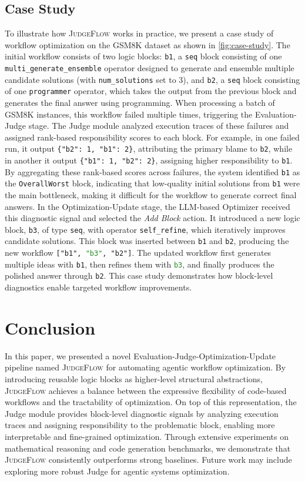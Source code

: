 \documentclass{article}
\theoremstyle{plain}
\theoremstyle{definition}
\theoremstyle{remark}
\def \our{\textsc{JudgeFlow}}
\begin{document}
\subsection{Case Study}
To illustrate how \our{} works in practice, we present a case study of workflow optimization on the GSM8K dataset as shown in \cref{fig:case-study}. The initial workflow consists of two logic blocks: \texttt{b1}, a \texttt{seq} block consisting of one \texttt{multi\_generate\_ensemble} operator designed to generate and ensemble multiple candidate solutions (with \texttt{num\_solutions} set to 3), and \texttt{b2}, a \texttt{seq} block consisting of one \texttt{programmer} operator, which takes the output from the previous block and generates the final answer using programming. When processing a batch of GSM8K instances, this workflow failed multiple times, triggering the Evaluation-Judge stage. The Judge module analyzed execution traces of these failures and assigned rank-based responsibility scores to each block. For example, in one failed run, it output \texttt{\{"b2": 1, "b1": 2\}}, attributing the primary blame to \texttt{b2}, while in another it output \texttt{\{"b1": 1, "b2": 2\}}, assigning higher responsibility to \texttt{b1}. By aggregating these rank-based scores across failures, the system identified \texttt{b1} as the \texttt{OverallWorst} block, indicating that low-quality initial solutions from \texttt{b1} were the main bottleneck, making it difficult for the workflow to generate correct final answers. In the Optimization-Update stage, the LLM-based Optimizer received this diagnostic signal and selected the \textit{Add Block} action. It introduced a new logic block, \texttt{b3}, of type \texttt{seq}, with operator \texttt{self\_refine}, which iteratively improves candidate solutions. This block was inserted between \texttt{b1} and \texttt{b2}, producing the new workflow \texttt{["b1", \textcolor{ForestGreen}{"b3"}, "b2"]}. The updated workflow first generates multiple ideas with \texttt{b1}, then refines them with \textcolor{ForestGreen}{\texttt{b3}}, and finally produces the polished answer through \texttt{b2}. This case study demonstrates how block-level diagnostics enable targeted workflow improvements.

\section{Conclusion}
In this paper, we presented a novel Evaluation-Judge-Optimization-Update pipeline named \our{} for automating agentic workflow optimization. By introducing reusable logic blocks as higher-level structural abstractions, \our{} achieves a balance between the expressive flexibility of code-based workflows and the tractability of optimization. On top of this representation, the Judge module provides block-level diagnostic signals by analyzing execution traces and assigning responsibility to the problematic block, enabling more interpretable and fine-grained optimization. Through extensive experiments on mathematical reasoning and code generation benchmarks, we demonstrate that \our{} consistently outperforms strong baselines.
Future work may include exploring more robust Judge for agentic systems optimization.
\end{document}
